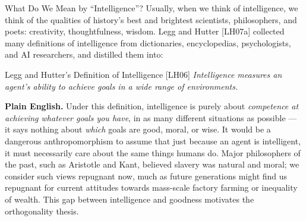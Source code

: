 \documentclass[aspectratio=169,10pt]{beamer}
\begin{document}
\begin{frame}{What Do We Mean by ``Intelligence''?}
  Usually, when we think of intelligence, we think of the qualities of
  history's best and brightest scientists, philosophers, and poets:
  creativity, thoughtfulness, wisdom. Legg and Hutter [LH07a] collected
  many definitions of intelligence from dictionaries, encyclopedias,
  psychologists, and AI researchers, and distilled them into:

  \begin{block}{Legg and Hutter's Definition of Intelligence [LH06]}
    \emph{Intelligence measures an agent's ability to achieve goals in a
    wide range of environments.}
  \end{block}

  \textbf{Plain English.} Under this definition, intelligence is purely
  about \emph{competence at achieving whatever goals you have}, in as many
  different situations as possible --- it says nothing about \emph{which}
  goals are good, moral, or wise. It would be a dangerous anthropomorphism
  to assume that just because an agent is intelligent, it must
  necessarily care about the same things humans do. Major philosophers of
  the past, such as Aristotle and Kant, believed slavery was natural and
  moral; we consider such views repugnant now, much as future generations
  might find us repugnant for current attitudes towards mass-scale
  factory farming or inequality of wealth. This gap between intelligence
  and goodness motivates the orthogonality thesis.
\end{frame}
\end{document}
